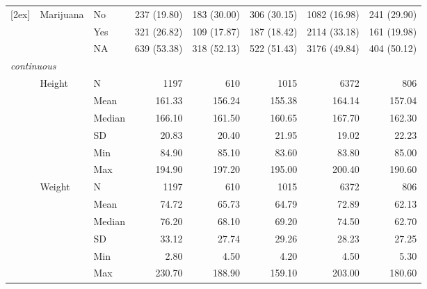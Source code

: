 \documentclass{article}
\begin{document}
\begin{longtable}{lllrrrrr}
[2ex]
 & Marijuana & No & 237  (19.80) & 183  (30.00) & 306  (30.15) & 1082 (16.98) & 241  (29.90) \\
 &  & Yes & 321  (26.82) & 109  (17.87) & 187  (18.42) & 2114 (33.18) & 161  (19.98) \\
 &  & NA & 639  (53.38) & 318  (52.13) & 522  (51.43) & 3176 (49.84) & 404  (50.12) \\
[2ex]
\multicolumn{ 7 }{l}{\textit{ continuous }}\\
& Height & N & 1197 & 610 & 1015 & 6372 & 806 \\
 &  & Mean & 161.33 & 156.24 & 155.38 & 164.14 & 157.04 \\
 &  & Median & 166.10 & 161.50 & 160.65 & 167.70 & 162.30 \\
 &  & SD & 20.83 & 20.40 & 21.95 & 19.02 & 22.23 \\
 &  & Min & 84.90 & 85.10 & 83.60 & 83.80 & 85.00 \\
 &  & Max & 194.90 & 197.20 & 195.00 & 200.40 & 190.60 \\
[2ex]
 & Weight & N & 1197 & 610 & 1015 & 6372 & 806 \\
 &  & Mean & 74.72 & 65.73 & 64.79 & 72.89 & 62.13 \\
 &  & Median & 76.20 & 68.10 & 69.20 & 74.50 & 62.70 \\
 &  & SD & 33.12 & 27.74 & 29.26 & 28.23 & 27.25 \\
 &  & Min & 2.80 & 4.50 & 4.20 & 4.50 & 5.30 \\
 &  & Max & 230.70 & 188.90 & 159.10 & 203.00 & 180.60 \\
[2ex]
\end{longtable}

\endgroup
\newpage
\end{document}
